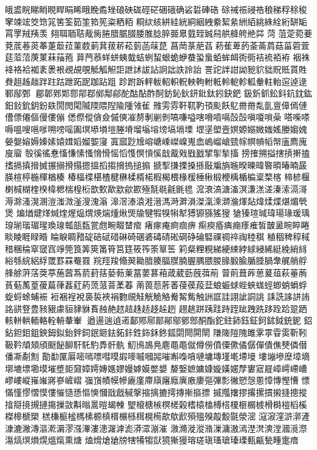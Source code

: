 皒盚睆睇睄睍睅睊睎睋睌矞矬硠硤硥硜硭硱硪确硰硩硨硞
硢祴祳祲祰稂稊稃稌稄窙竦竤筊筇筄筈筌筎筀筘筅粢粞粨
粡絘絯絣絓絖絧絪絏絭絜絫絒絔絩絑絟絎缾缿罥罦羢羠羡
翗聑聏聐胾胔腃腊腒腏腇脽腍脺臦臮臷臸臹舄舼舽舿艵茻
菏菹萣菀菨萒菧菤菼菶萐菆菈菫菣莿萁菝菥菘菿菡菋菎
菖菵菉萉萏菞萑萆菂菳菕菺菇菑菪萓莚菃菬菮菄菻菗菢
萛菛菾蛘蛢蛦蛓蛣蛚蛪蛝蛫蛜蛬蛩蛗蛨蛑衈衖衕袺裗袹袸
裀袾袶袼袷袽袲褁裉覕覘覗觝觚觛詎詍訹詙詀詗詘詄詅詒
詈詑詊詌詏豟貁貀貺貾貰貹貵趄趀趉跘跓跍跇跖跜跏跕跙
跈跗跅軯軷軺軹軦軮軥軵軧軨軶軫軱軬軴軩逭逴逯鄆鄬鄄
郿郼鄈郹郻鄁鄀鄇鄅鄃酡酤酟酢酠鈁鈊鈥鈃鈚鈦鈏鈌鈀
鈒釿釽鈆鈄鈧鈂鈜鈤鈙鈗鈅鈖镻閍閌閐隇陾隈隉隃隀雂雈
雃雱雰靬靰靮頇颩飫鳦⿋黹亃亄亶傽傿僆傮僄僊傴僈僂傰
僁傺傱僋僉傶傸凗剺剸剻剼嗃嗛嗌嗐嗋嗊嗝嗀嗀嗔嗄嗩喿
嗒喍嗏嗕嗢嗖嗈嗲嗍嗙嗂圔塓塨塤塏塍塉塯塕塎塝塙塥塛
堽塣塱壼嫇嫄嫋媺媸媱媵媰媿嫈媻嫆媷嫀嫊媴媶嫍媹媐寖
寘寙尟尳嵱嵣嵊嵥嵲嵬嵞嵨嵧嵢巰幏幎幊幍幋廅廌廆廋廇
彀徯徭惷慉慊愫慅愶愲愮慆愯慏愩慀戠酨戣戥戤揅揱揫搐
搒搉搠搤搳摃搟搕搘搹搷搢搣搌搦搰搨摁搵搯搊搚摀搥搧
搋揧搛搮搡搎敯斒旓暆暌暕暐暋暊暙暔晸朠楦楟椸楎楢楱
椿楅楪椹楂楗楙楺楈楉椵楬椳椽楥棰楸椴楩楀楯楄楶楘楁
楴楌椻楋椷楜楏楑椲楒椯楻椼歆歅歃歂歈歁殛毻毼毹毷毸
溛滖滈溏滀溟溓溔溠溱溹滆滒溽滁溞滉溷溰滍溦滏溲溾滃
滜滘溙溒溎溍溤溡溿溳滐滊溗溮溣煇煔煒煣煠煁煝煢煲
煸煪煡煂煘煃煋煰煟煐煓煄煍煚牏犍犌犑犐犎猼獂猻猺獀
獊獉瑄瑊瑋瑒瑑瑗瑀瑏瑐瑎瑂瑆瑍瑔瓡瓿瓾瓽甝畹畷榃痯
瘏瘃痷痾痼痹痸瘐痻痶痭痵痽皙皵盝睕睟睠睒睖睚睩睧
睔睙睭矠碇碚碔碏碄碕碅碆碡碃硹碙碀碖硻祼禂祽祹稑稘
稙稒稗稕稢稓稛稐窣窢窞竫筦筤筭筴筩筲筥筳筱筰筡筸筶
筣粲粴粯綈綆綀綍絿綅絺綎絻綃絼綌綔綄絽綒罭罫罧罨罬
羦羥羧翛翜耡腤腠腷腜腩腛腢腲朡腞腶腧腯腄腡舝艉艄艀
艂艅蓱萿葖葶葹蒏蒍葥葑葀蒆葧萰葍葽葚葙葴葳葝蔇葞萷
萺萴葺葃葸萲葅萩菙葋萯葂萭葟葰萹葎葌葒葯蓅蒎萻葇萶
萳葨葾葄萫葠葔葮葐蜋蜄蛷蜌蛺蛖蛵蝍蛸蜎蜉蜁蛶蜍蜅裖
裋裍裎裞裛裚裌裐覅覛觟觥觤觡觠觢觜触詶誆詿詡訿詷誂
誄詵誃誁詴詺谼豋豊豥豤豦貆貄貅賌赨赩趑趌趎趏趍趓趔
趐趒跰跠跬跱跮跐跩跣跢跧跲跫跴輆軿輁輀輅輇輈輂輋
遒逿遄遉逽鄐鄍鄏鄑鄖鄔鄋鄎酮酯鉈鉒鈰鈺鉦鈳鉥鉞銃鈮
鉊鉆鉭鉬鉏鉠鉧鉯鈶鉡鉰鈱鉔鉣鉐鉲鉎鉓鉌鉖鈲閟閜閞閛
隒隓隑隗雎雺雽雸雵靳靷靸靲頏頍頎颬飶飹馯馲馰馵骭骫
魛鳪鳭鳧麀⿌黽僦僔僗僨僳僛僪僝僤僓僬僰僯僣僠凘劀劁
勩勫匰厬嘧嘕嘌嘒嗼嘏嘜嘁嘓嘂嗺嘝嘄嗿嗹墉塼墐墘墆墁
塿塴墋塺墇墑墎塶墂墈塻墔墏壾奫嫜嫮嫥嫕嫪嫚嫭嫫嫳嫢
嫠嫛嫬嫞嫝嫙嫨嫟孷寠寣屣嶂嶀嵽嶆嵺嶁嵷嶊嶉嶈嵾嵼嶍
嵹嵿幘幙幓廘廑廗廎廜廕廙廒廔彄彃彯徶愬愨慁慞慱慳慒
慓慲慬憀慴慔慺慛慥愻慪慡慖戩戧戫搫摍摛摝摴摶摲摳摽
摵摦撦摎撂摞摜摋摓摠摐摿搿摬摫摙摥摷敳斠暡暠暟朅朄
朢榱榶槉榠槎榖榰榬榼榑榙榎榧榍榩榾榯榿槄榽榤槔榹槊
榚槏榳榓榪榡榞槙榗榐槂榵榥槆歊歍歋殞殟殠毃毄毾滎滵
滱漃漥滸漷滻漮漉潎漙漚漧漘漻漒滭漊漶潳滹滮漭潀漰漼
漵滫漇漎潃漅滽滶漹漜滼漺漟漍漞漈漡熇熐熉熀熅熂熏煻
熆熁熗牄牓犗犕犓獃獍獑獌瑢瑳瑱瑵瑲瑧瑮甀甂甃畽疐瘖
